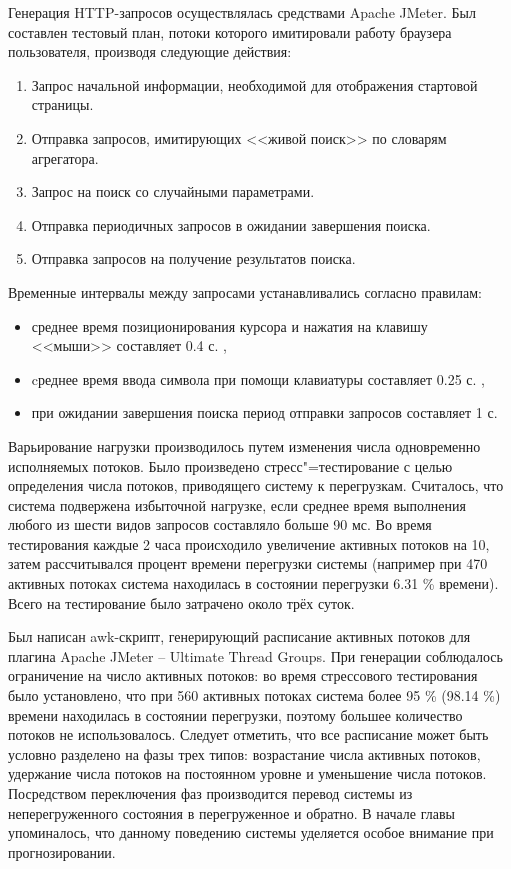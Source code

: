 \documentclass[a4paper,14pt,russian]{extreport}
\begin{document}
Генерация HTTP-запросов осуществлялась средствами Apache JMeter. Был 
составлен тестовый план, потоки которого имитировали работу браузера 
пользователя, производя следующие действия:
\begin{enumerate}
	\item Запрос начальной информации, необходимой для отображения 
		стартовой страницы.
	\item Отправка запросов, имитирующих <<живой поиск>> по словарям 
		агрегатора. 
	\item Запрос на поиск со случайными параметрами.
	\item Отправка периодичных запросов в ожидании завершения поиска.
	\item Отправка запросов на получение результатов поиска.
\end{enumerate}
Временные интервалы между запросами устанавливались согласно правилам: 
\begin{itemize}
	\item среднее время позиционирования курсора и нажатия на клавишу 
		<<мыши>> составляет 0.4 с. \cite{korablev2011},
	\item cреднее время ввода символа при помощи клавиатуры составляет 
		0.25 с. \cite{korablev2011},
	\item при ожидании завершения поиска период отправки запросов 
		составляет 1 с.
\end{itemize}
Варьирование нагрузки производилось путем изменения числа одновременно 
исполняемых потоков. Было произведено стресс"=тестирование с целью 
определения числа потоков, приводящего систему к перегрузкам. Считалось, 
что система подвержена избыточной нагрузке, если среднее время выполнения 
любого из шести видов запросов составляло больше 90 мс. Во время 
тестирования каждые 2 часа происходило увеличение активных потоков на 10, 
затем рассчитывался процент времени перегрузки системы (например при 470 
активных потоках система находилась в состоянии перегрузки 6.31 \% времени). 
Всего на тестирование было затрачено около трёх суток. 

Был написан awk-скрипт, генерирующий расписание активных потоков для 
плагина Apache JMeter -- Ultimate Thread Groups. При генерации соблюдалось 
ограничение на число активных потоков: во время стрессового тестирования 
было установлено, что при 560 активных потоках система более 95 \% (98.14 \%) 
времени находилась в состоянии перегрузки, поэтому большее количество 
потоков не использовалось. Следует отметить, что все расписание может быть 
условно разделено на фазы трех типов: возрастание числа активных потоков, 
удержание числа потоков на постоянном уровне и уменьшение числа потоков. 
Посредством переключения фаз производится перевод системы из 
неперегруженного состояния в перегруженное и обратно. В начале главы 
упоминалось, что данному поведению системы уделяется особое внимание при 
прогнозировании. 
\end{document}
